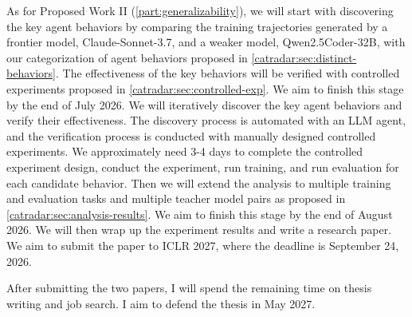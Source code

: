 \documentclass[12pt,openany]{cmuthesis}
\begin{document}
As for Proposed Work II (\autoref{part:generalizability}), we will start with discovering the key agent behaviors by comparing the training trajectories generated by a frontier model, Claude-Sonnet-3.7, and a weaker model, Qwen2.5Coder-32B, with our categorization of agent behaviors proposed in \autoref{catradar:sec:distinct-behaviors}. The effectiveness of the key behaviors will be verified with controlled experiments proposed in \autoref{catradar:sec:controlled-exp}. 
We aim to finish this stage by the end of July 2026. We will iteratively discover the key agent behaviors and verify their effectiveness. The discovery process is automated with an LLM agent, and the verification process is conducted with manually designed controlled experiments. We approximately need 3-4 days to complete the controlled experiment design, conduct the experiment, run training, and run evaluation for each candidate behavior.
Then we will extend the analysis to multiple training and evaluation tasks and multiple teacher model pairs as proposed in \autoref{catradar:sec:analysis-results}. We aim to finish this stage by the end of August 2026. We will then wrap up the experiment results and write a research paper. We aim to submit the paper to ICLR 2027, where the deadline is September 24, 2026.

After submitting the two papers, I will spend the remaining time on thesis writing and job search. I aim to defend the thesis in May 2027.



\backmatter


\renewcommand{\bibsection}{\chapter{\bibname}}

\end{document}
